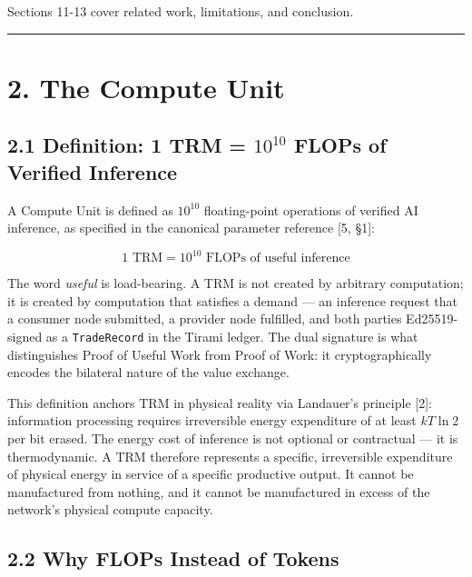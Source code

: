 \documentclass[
  11pt,
]{article}
\begin{document}
Sections 11-13 cover related work, limitations, and conclusion.

\begin{center}\rule{0.5\linewidth}{0.5pt}\end{center}

\section{2. The Compute Unit}\label{the-compute-unit}

\subsection{\texorpdfstring{2.1 Definition: 1 TRM = \(10^{10}\) FLOPs of
Verified
Inference}{2.1 Definition: 1 TRM = 10\^{}\{10\} FLOPs of Verified Inference}}\label{definition-1-trm-1010-flops-of-verified-inference}

A Compute Unit is defined as \(10^{10}\) floating-point operations of
verified AI inference, as specified in the canonical parameter reference
{[}5, §1{]}:

\[\text{1 TRM} = 10^{10} \text{ FLOPs of useful inference}\]

The word \emph{useful} is load-bearing. A TRM is not created by
arbitrary computation; it is created by computation that satisfies a
demand --- an inference request that a consumer node submitted, a
provider node fulfilled, and both parties Ed25519-signed as a
\texttt{TradeRecord} in the Tirami ledger. The dual signature is what
distinguishes Proof of Useful Work from Proof of Work: it
cryptographically encodes the bilateral nature of the value exchange.

This definition anchors TRM in physical reality via Landauer's principle
{[}2{]}: information processing requires irreversible energy expenditure
of at least \(kT \ln 2\) per bit erased. The energy cost of inference is
not optional or contractual --- it is thermodynamic. A TRM therefore
represents a specific, irreversible expenditure of physical energy in
service of a specific productive output. It cannot be manufactured from
nothing, and it cannot be manufactured in excess of the network's
physical compute capacity.

\subsection{2.2 Why FLOPs Instead of
Tokens}\label{why-flops-instead-of-tokens}
\end{document}
